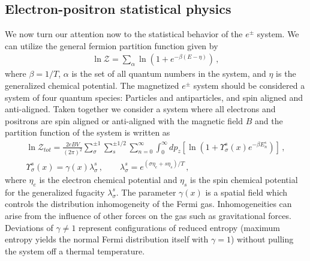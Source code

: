 \documentclass[universe,article,submit,moreauthors,pdftex,a4paper]{Definitions/mdpi}
\begin{document}
\subsection{Electron-positron statistical physics}\label{sec:Partition}
\noindent We now turn our attention now to the statistical behavior of the $e^{\pm}$ system. We can utilize the general fermion partition function given by~\cite{Elze:1980er}
\begin{align}
 \label{PartFunc} \ln\mathcal{Z}=\sum_{\alpha}\ln\left(1+e^{-\beta(E-\eta)}\right)\,,
\end{align}
where $\beta=1/T$, $\alpha$ is the set of all quantum numbers in the system, and $\eta$ is the generalized chemical potential. The magnetized $e^{\pm}$ system should be considered a system of four quantum species: Particles and antiparticles, and spin aligned and anti-aligned. Taken together we consider a system where all electrons and positrons are spin aligned or anti-aligned with the magnetic field $B$ and the partition function of the system is written as
\begin{align}
 \label{PartFuncB}\ln\mathcal{Z}_{tot}=\frac{2eBV}{(2\pi)^2}\sum_{\sigma}^{\pm1}\sum_{s}^{\pm1/2}\sum_{n=0}^\infty\int^\infty_{0}dp_z\left[\ln\left(1+\Upsilon_{\sigma}^{s}(x)e^{-\beta E_{n}^{s}}\right)\right]\,,\\
 \label{Fugacity}\Upsilon_{\sigma}^{s}(x)=\gamma(x)\lambda_{\sigma}^{s}\,,\qquad\lambda_{\sigma}^{s}=e^{(\sigma\eta_{e}+s\eta_{s})/T}\,,
\end{align}
where $\eta_{e}$ is the electron chemical potential and $\eta_s$ is the spin chemical potential for the generalized fugacity $\lambda_{\sigma}^{s}$. The parameter $\gamma(x)$ is a spatial field which controls the distribution inhomogeneity of the Fermi gas. Inhomogeneities can arise from the influence of other forces on the gas such as gravitational forces. Deviations of $\gamma\neq1$ represent configurations of reduced entropy (maximum entropy yields the normal Fermi distribution itself with $\gamma=1$) without pulling the system off a thermal temperature.
\end{document}
